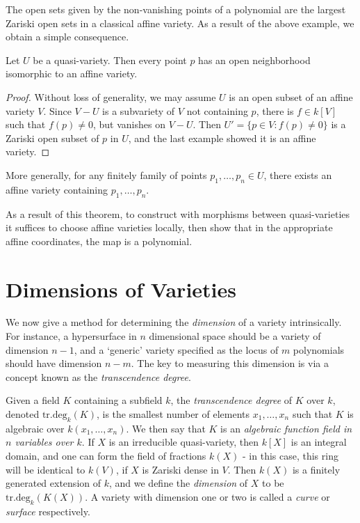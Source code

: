 The open sets given by the non-vanishing points of a polynomial are the largest Zariski open sets in a classical affine variety. As a result of the above example, we obtain a simple consequence.

\begin{theorem}
    Let $U$ be a quasi-variety. Then every point $p$ has an open neighborhood isomorphic to an affine variety.
\end{theorem}
\begin{proof}
    Without loss of generality, we may assume $U$ is an open subset of an affine variety $V$. Since $V - U$ is a subvariety of $V$ not containing $p$, there is $f \in k[V]$ such that $f(p) \neq 0$, but vanishes on $V - U$. Then $U' = \{ p \in V : f(p) \neq 0 \}$ is a Zariski open subset of $p$ in $U$, and the last example showed it is an affine variety.
\end{proof}

\begin{remark}
    More generally, for any finitely family of points $p_1,\dots,p_n \in U$, there exists an affine variety containing $p_1,\dots,p_n$.
\end{remark}

As a result of this theorem, to construct with morphisms between quasi-varieties it suffices to choose affine varieties locally, then show that in the appropriate affine coordinates, the map is a polynomial.

\section{Dimensions of Varieties}

We now give a method for determining the \emph{dimension} of a variety intrinsically. For instance, a hypersurface in $n$ dimensional space should be a variety of dimension $n-1$, and a `generic' variety specified as the locus of $m$ polynomials should have dimension $n-m$. The key to measuring this dimension is via a concept known as the \emph{transcendence degree}.

Given a field $K$ containing a subfield $k$, the \emph{transcendence degree} of $K$ over $k$, denoted $\text{tr.deg}_k(K)$, is the smallest number of elements $x_1,\dots,x_n$ such that $K$ is algebraic over $k(x_1,\dots,x_n)$. We then say that $K$ is an \emph{algebraic function field in $n$ variables over $k$}. If $X$ is an irreducible quasi-variety, then $k[X]$ is an integral domain, and one can form the field of fractions $k(X)$ - in this case, this ring will be identical to $k(V)$, if $X$ is Zariski dense in $V$. Then $k(X)$ is a finitely generated extension of $k$, and we define the \emph{dimension} of $X$ to be $\text{tr.deg}_k(K(X))$. A variety with dimension one or two is called a \emph{curve} or \emph{surface} respectively.

